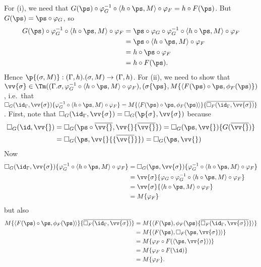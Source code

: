 \documentclass{article}
\newcommand{\isoFL}{\ensuremath{\phi_{F}}} %
\begin{document}
For (i), we need that $G(\ps) \circ \varphi_G^{-1} \circ \langle h
\circ \ps, M\rangle \circ \varphi_F = h \circ F(\ps)$. But $G(\ps) = \ps \circ \varphi_G$, so
\begin{align*}
   G(\ps) \circ \varphi_G^{-1} \circ \langle h \circ \ps, M\rangle \circ \varphi_F
&= \ps \circ \varphi_G \circ \varphi_G^{-1} \circ \langle h \circ \ps, M\rangle \circ \varphi_F \\
&= \ps \circ \langle h \circ \ps, M\rangle \circ \varphi_F \\
&= h \circ \ps \circ \varphi_F \\
&= h \circ F(\ps).
\end{align*}
Hence $\p{(\sigma, M)} : (\Gamma, h).(\sigma, M) \to (\Gamma, h)$.
For (ii), we need to show that $\vv{\sigma} \in
\Tm((\Gamma.\sigma, \varphi_G^{-1} \circ \langle h \circ \ps, M
\rangle \circ \varphi_F), (\sigma\{\ps\}, M\{\langle F(\ps) \circ \ps,
\isoFL(\ps)\})$, i.e.\ that
$\square_G(\id_\Gamma, \vv{\sigma})\{\varphi_G^{-1} \circ \langle h \circ \ps, M
\rangle \circ \varphi_F\} = M\{\langle F(\ps) \circ \ps,
\isoFL(\ps)\rangle\}\{\overline{\square_F(\id_{\Gamma}, \vv{\sigma})}\}$. First, note that
$\square_G(\id_\Gamma, \vv{\sigma}) = \square_G(\p{\sigma}, \vv{\sigma})$ because
\begin{align*}
\square_G(\id, \vv{}) &= \square_G(\ps \circ \overline{\vv{}}, \vv{}\{\overline{\vv{}}\})
                      = \square_G(\ps, \vv{})\{G(\overline{\vv{}})\} \\
                      &= \square_G(\ps, \vv{}{\{\overline{\vv{}}\}})
                      = \square_G(\ps, \vv{})
\end{align*}
Now
\begin{align*}
  \square_G(\id_\Gamma, \vv{\sigma})\{\varphi_G^{-1} \circ \langle h \circ \ps, M
\rangle \circ \varphi_F\}
 &= \square_G(\ps, \vv{\sigma})\{\varphi_G^{-1} \circ \langle h \circ \ps, M
\rangle \circ \varphi_F\} \\
 &= \vv{\sigma}\{\varphi_G \circ \varphi_G^{-1} \circ \langle h \circ \ps, M
\rangle \circ \varphi_F\} \\
 &= \vv{\sigma}\{\langle h \circ \ps, M \rangle \circ \varphi_F\} \\
 &= M\{\varphi_F\}
\end{align*}
but also
\begin{align*}
  M\{\langle F(\ps) \circ \ps,
\isoFL(\ps)\rangle\}\{\overline{\square_F(\id_{\Gamma}, \vv{\sigma})}\}
 &= M\{\langle F(\ps),\isoFL(\ps)\{\overline{\square_F(\id_{\Gamma}, \vv{\sigma})}\}\rangle\} \\
 &= M\{\langle F(\ps),\square_F(\ps, \vv{\sigma})\rangle\} \\
 &= M\{\varphi_F \circ F(\langle \ps, \vv{\sigma}\rangle)\} \\
 &= M\{\varphi_F \circ F(\id)\} \\
 &= M\{\varphi_F\} .
\end{align*}
\end{document}
